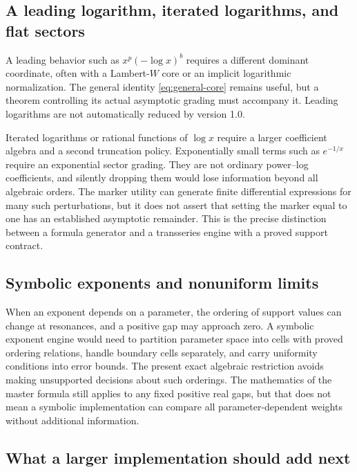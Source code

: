 \documentclass[11pt,a4paper]{article}
\numberwithin{equation}{section}
\theoremstyle{definition}
\theoremstyle{remark}
\begin{document}
\subsection{A leading logarithm, iterated logarithms, and flat sectors}

A leading behavior such as $x^p(-\log x)^b$ requires a different dominant
coordinate, often with a Lambert-$W$ core or an implicit logarithmic
normalization. The general identity \eqref{eq:general-core} remains useful,
but a theorem controlling its actual asymptotic grading must accompany it.
Leading logarithms are not automatically reduced by version 1.0.

Iterated logarithms or rational functions of $\log x$ require a larger
coefficient algebra and a second truncation policy. Exponentially small
terms such as $e^{-1/x}$ require an exponential sector grading. They are
not ordinary power--log coefficients, and silently dropping them would lose
information beyond all algebraic orders. The marker utility can generate
finite differential expressions for many such perturbations, but it does
not assert that setting the marker equal to one has an established
asymptotic remainder. This is the precise distinction between a formula
generator and a transseries engine with a proved support contract.

\subsection{Symbolic exponents and nonuniform limits}

When an exponent depends on a parameter, the ordering of support values can
change at resonances, and a positive gap may approach zero. A symbolic
exponent engine would need to partition parameter space into cells with
proved ordering relations, handle boundary cells separately, and carry
uniformity conditions into error bounds. The present exact algebraic
restriction avoids making unsupported decisions about such orderings.
The mathematics of the master formula still applies to any fixed positive
real gaps, but that does not mean a symbolic implementation can compare all
parameter-dependent weights without additional information.

\subsection{What a larger implementation should add next}
\end{document}
